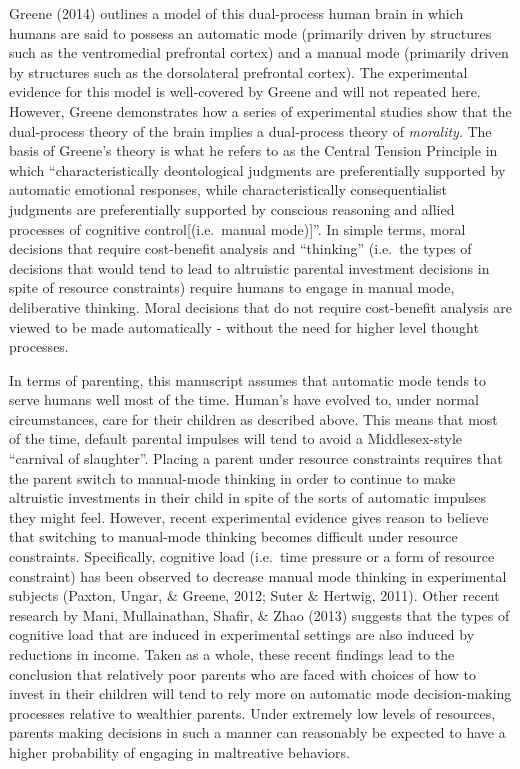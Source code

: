 \documentclass[review]{elsarticle}\usepackage[]{graphicx}\usepackage[]{color}
\begin{document}
Greene (2014) outlines a model of this dual-process human brain in
which humans are said to possess an automatic mode (primarily driven by
structures such as the ventromedial prefrontal cortex) and a manual mode
(primarily driven by structures such as the dorsolateral prefrontal
cortex). The experimental evidence for this model is well-covered by
Greene and will not repeated here. However, Greene demonstrates how a
series of experimental studies show that the dual-process theory of the
brain implies a dual-process theory of \emph{morality}. The basis of
Greene's theory is what he refers to as the Central Tension Principle in
which ``characteristically deontological judgments are preferentially
supported by automatic emotional responses, while characteristically
consequentialist judgments are preferentially supported by conscious
reasoning and allied processes of cognitive control{[}(i.e.~manual
mode){]}''. In simple terms, moral decisions that require cost-benefit
analysis and ``thinking'' (i.e.~the types of decisions that would tend
to lead to altruistic parental investment decisions in spite of resource
constraints) require humans to engage in manual mode, deliberative
thinking. Moral decisions that do not require cost-benefit analysis are
viewed to be made automatically - without the need for higher level
thought processes.

In terms of parenting, this manuscript assumes that automatic mode tends
to serve humans well most of the time. Human's have evolved to, under
normal circumstances, care for their children as described above. This
means that most of the time, default parental impulses will tend to
avoid a Middlesex-style ``carnival of slaughter''. Placing a parent
under resource constraints requires that the parent switch to
manual-mode thinking in order to continue to make altruistic investments
in their child in spite of the sorts of automatic impulses they might
feel. However, recent experimental evidence gives reason to believe that
switching to manual-mode thinking becomes difficult under resource
constraints. Specifically, cognitive load (i.e.~time pressure or a form
of resource constraint) has been observed to decrease manual mode
thinking in experimental subjects (Paxton, Ungar, \& Greene, 2012; Suter
\& Hertwig, 2011). Other recent research by Mani, Mullainathan, Shafir,
\& Zhao (2013) suggests that the types of cognitive load that are
induced in experimental settings are also induced by reductions in
income. Taken as a whole, these recent findings lead to the conclusion
that relatively poor parents who are faced with choices of how to invest
in their children will tend to rely more on automatic mode
decision-making processes relative to wealthier parents. Under extremely
low levels of resources, parents making decisions in such a manner can
reasonably be expected to have a higher probability of engaging in
maltreative behaviors.
\end{document}
